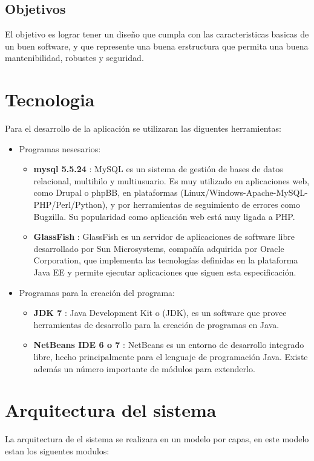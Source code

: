 \documentclass[12pt]{article}
\begin{document}
\subsection{Objetivos}
El objetivo es lograr tener un diseño que cumpla con las caracteristicas basicas de un buen software, y que represente una buena erstructura que permita una buena mantenibilidad, robustes y seguridad.

\section{Tecnologia}
Para el desarrollo de la aplicaci\'on se utilizaran las diguentes herramientas:
\begin{itemize}
\item
Programas nesesarios:
\begin{itemize}
\item
\textbf{mysql 5.5.24} : MySQL es un sistema de gesti\'on de bases de datos relacional, multihilo y multiusuario. Es muy utilizado en aplicaciones web, como Drupal o phpBB, en plataformas (Linux/Windows-Apache-MySQL-PHP/Perl/Python), y por herramientas de seguimiento de errores como Bugzilla. Su popularidad como aplicaci\'on web est\'a muy ligada a PHP.\\
\item
\textbf{GlassFish} : GlassFish es un servidor de aplicaciones de software libre desarrollado por Sun Microsystems, compañía adquirida por Oracle Corporation, que implementa las tecnologías definidas en la plataforma Java EE y permite ejecutar aplicaciones que siguen esta especificación. \\
\end{itemize}
\item
Programas para la creaci\'on del programa:
\begin{itemize}
\item
\textbf{JDK 7} : Java Development Kit o (JDK), es un software que provee herramientas de desarrollo para la creaci\'on de programas en Java.\\
\item
\textbf{NetBeans IDE 6 o 7} : NetBeans es un entorno de desarrollo integrado libre, hecho principalmente para el lenguaje de programaci\'on Java. Existe adem\'as un n\'umero importante de m\'odulos para extenderlo.\\
\end{itemize}
\end{itemize}

\section{Arquitectura del sistema}
La arquitectura de el sistema se realizara en un modelo por capas, en este modelo estan los siguentes modulos:\\
\end{document}
